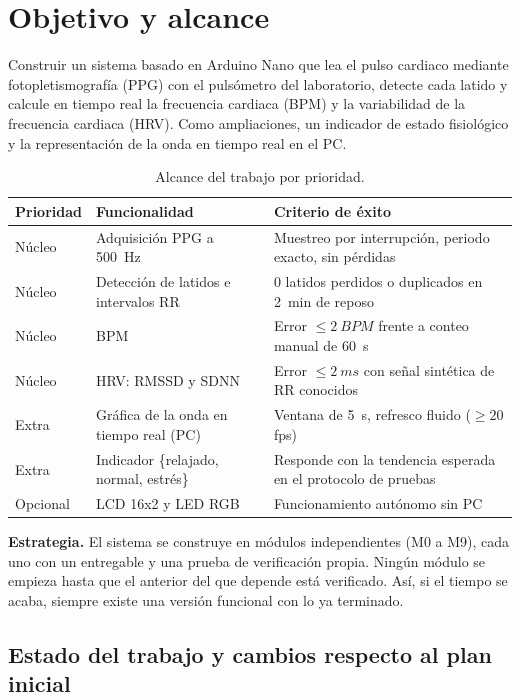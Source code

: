 \documentclass[11pt,a4paper]{article}
\begin{document}
\setcounter{page}{1}
\tableofcontents
\newpage

\section{Objetivo y alcance}

Construir un sistema basado en Arduino Nano que lea el pulso cardiaco mediante
fotopletismografía (PPG) con el pulsómetro del laboratorio, detecte cada latido y calcule
en tiempo real la frecuencia cardiaca (BPM) y la variabilidad de la frecuencia cardiaca
(HRV). Como ampliaciones, un indicador de estado fisiológico y la representación de la onda
en tiempo real en el PC.

\begin{table}[H]
\centering\small
\caption{Alcance del trabajo por prioridad.}
\label{tab:alcance}
\begin{tabularx}{\textwidth}{llX}
\toprule
Prioridad & Funcionalidad & Criterio de éxito \\
\midrule
Núcleo & Adquisición PPG a \qty{500}{Hz} & Muestreo por interrupción, periodo exacto, sin pérdidas \\
Núcleo & Detección de latidos e intervalos RR & 0 latidos perdidos o duplicados en \qty{2}{min} de reposo \\
Núcleo & BPM & Error $\le \qty{2}{BPM}$ frente a conteo manual de \qty{60}{s} \\
Núcleo & HRV: RMSSD y SDNN & Error $\le \qty{2}{ms}$ con señal sintética de RR conocidos \\
Extra  & Gráfica de la onda en tiempo real (PC) & Ventana de \qty{5}{s}, refresco fluido ($\ge 20$ fps) \\
Extra  & Indicador \{relajado, normal, estrés\} & Responde con la tendencia esperada en el protocolo de pruebas \\
Opcional & LCD 16x2 y LED RGB & Funcionamiento autónomo sin PC \\
\bottomrule
\end{tabularx}
\end{table}

\textbf{Estrategia.} El sistema se construye en módulos independientes (M0 a M9), cada uno
con un entregable y una prueba de verificación propia. Ningún módulo se empieza hasta que el
anterior del que depende está verificado. Así, si el tiempo se acaba, siempre existe una
versión funcional con lo ya terminado.

\subsection{Estado del trabajo y cambios respecto al plan inicial}
\label{sec:estado}
\end{document}
